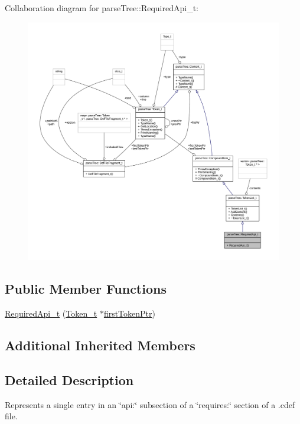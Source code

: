 Collaboration diagram for parse\+Tree\+:\+:Required\+Api\+\_\+t\+:
\nopagebreak
\begin{figure}[H]
\begin{center}
\leavevmode
\includegraphics[width=350pt]{structparse_tree_1_1_required_api__t__coll__graph}
\end{center}
\end{figure}
\subsection*{Public Member Functions}
\begin{DoxyCompactItemize}
\item 
\hyperlink{structparse_tree_1_1_required_api__t_ae2cd0713f10fc6bbc44de1140f4206b1}{Required\+Api\+\_\+t} (\hyperlink{structparse_tree_1_1_token__t}{Token\+\_\+t} $\ast$\hyperlink{structparse_tree_1_1_compound_item__t_a587020c943e760cb0152dd8cd31e21ef}{first\+Token\+Ptr})
\end{DoxyCompactItemize}
\subsection*{Additional Inherited Members}


\subsection{Detailed Description}
Represents a single entry in an \char`\"{}api\+:\char`\"{} subsection of a \char`\"{}requires\+:\char`\"{} section of a .cdef file. 

